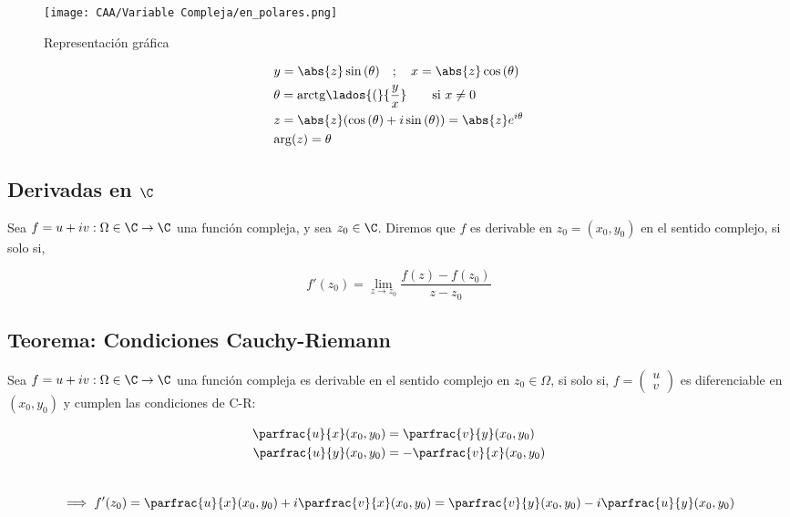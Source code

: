 \begin{minipage}{0.5\textwidth}%
    \begin{figure}[H]
        \centering
        \texttt{[image: CAA/Variable Compleja/en\_polares.png]}
        \caption{Representación gráfica}
    \end{figure}
\end{minipage}%
\begin{minipage}{0.5\textwidth}%
    \begin{equation}
        \begin{split}
            &y = \abs{z}\sin{(\theta)}\quad ;\quad x = \abs{z}\cos{(\theta)}\\
            &\theta = \mathrm{arctg}\lados{(}{\frac{y}{x}}\quad \quad \text{si } x \ne 0\\
            &z = \abs{z}(\cos{(\theta)} +i\sin{(\theta)}) = \abs{z}e^{i\theta}\\
            &\mathrm{arg}(z) = \theta
        \end{split}
        \nonumber
    \end{equation}
\end{minipage}%

\subsection{Derivadas en $\C$}
Sea $f = u +iv:\Omega \in \C \to \C$ una función compleja, y sea $z_0 \in \C$. Diremos que $f$ es derivable en $z_0 = (x_0, y_0)$ en el sentido complejo, si solo si,

\[ f'(z_0) = \lim_{z \to z_0} \frac{f(z) - f(z_0)}{z-z_0} \]

\subsection{Teorema: Condiciones Cauchy-Riemann}
Sea $f = u +iv:\Omega \in \C \to \C$ una función compleja es derivable en el sentido complejo en $z_0 \in \Omega $, si solo si, $ f = \begin{pmatrix}u\\v \end{pmatrix}$ es diferenciable en $(x_0, y_0)$ y cumplen las condiciones de C-R:

\begin{equation}
\begin{split}
    \parfrac{u}{x}(x_0,y_0) &= \parfrac{v}{y}(x_0, y_0)\\
    \parfrac{u}{y}(x_0, y_0) &= -\parfrac{v}{x}(x_0, y_0)
\end{split}
\nonumber
\end{equation}
\hfill\\
\[\implies f'(z_0) = \parfrac{u}{x}(x_0,y_0) + i \parfrac{v}{x}(x_0,y_0) = \parfrac{v}{y}(x_0,y_0) - i \parfrac{u}{y}(x_0,y_0)\]

